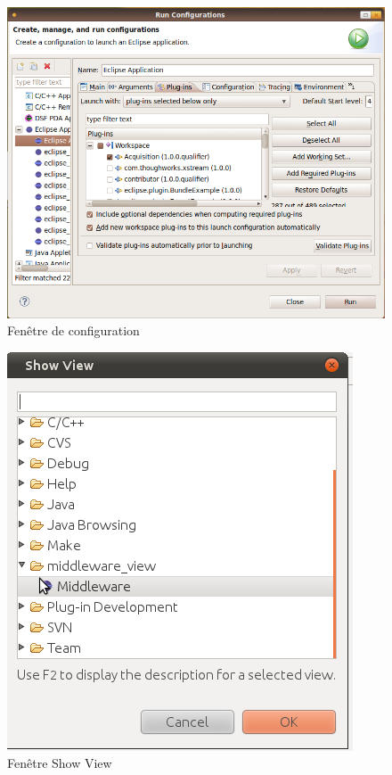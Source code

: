   \begin{figure}[h]
	  \centering
	  \includegraphics[scale=0.40]{img/tuto}
	  \caption{Fenêtre de configuration}
	  \label{fig:fenetreConfg}
\end{figure}
  \begin{figure}
	  \centering
	  \includegraphics[scale=0.50]{img/ShowView}
	  \caption{Fenêtre Show View}
	  \label{fig:ShowView}
\end{figure}


